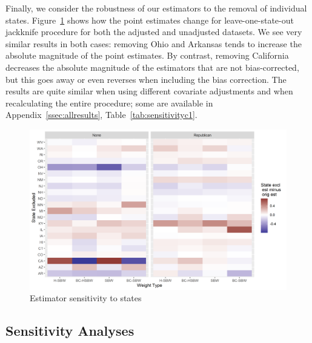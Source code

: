 \documentclass[12pt]{article}
\begin{document}
Finally, we consider the robustness of our estimators to the removal of individual states. Figure~\ref{fig:loostateplot} shows how the point estimates change for leave-one-state-out jackknife procedure for both the adjusted and unadjusted datasets. We see very similar results in both cases: removing Ohio and Arkansas tends to increase the absolute magnitude of the point estimates. By contrast, removing California decreases the absolute magnitude of the estimators that are not bias-corrected, but this goes away or even reverses when including the bias correction. The results are quite similar when using different covariate adjustments and when recalculating the entire procedure; some are available in Appendix~\ref{ssec:allresults}, Table~\ref{tab:sensitivityc1}. 

\begin{figure}[]
\begin{center}
    \includegraphics[scale=0.6]{01_Plots/c1-loostate-sensitivity.png}
    \caption{Estimator sensitivity to states}
    \label{fig:loostateplot}
\end{center}
\end{figure}

\subsection{Sensitivity Analyses} \label{sssec:sensitivity}
\end{document}
